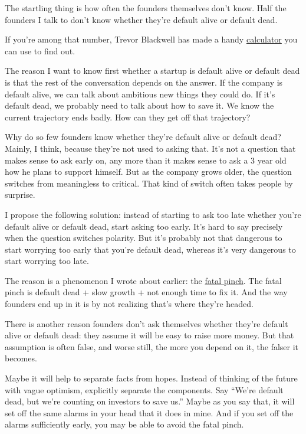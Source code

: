 \documentclass[12pt]{book}
\begin{document}
The startling thing is how often the founders themselves don't know.
Half the founders I talk to don't know whether they're default alive or
default dead.

If you're among that number, Trevor Blackwell has made a handy
\href{http://growth.tlb.org/\#}{calculator} you can use to find out.

The reason I want to know first whether a startup is default alive or
default dead is that the rest of the conversation depends on the answer.
If the company is default alive, we can talk about ambitious new things
they could do. If it's default dead, we probably need to talk about how
to save it. We know the current trajectory ends badly. How can they get
off that trajectory?

Why do so few founders know whether they're default alive or default
dead? Mainly, I think, because they're not used to asking that. It's not
a question that makes sense to ask early on, any more than it makes
sense to ask a 3 year old how he plans to support himself. But as the
company grows older, the question switches from meaningless to critical.
That kind of switch often takes people by surprise.

I propose the following solution: instead of starting to ask too late
whether you're default alive or default dead, start asking too early.
It's hard to say precisely when the question switches polarity. But it's
probably not that dangerous to start worrying too early that you're
default dead, whereas it's very dangerous to start worrying too late.

The reason is a phenomenon I wrote about earlier: the
\href{pinch.html}{fatal pinch}. The fatal pinch is default dead + slow
growth + not enough time to fix it. And the way founders end up in it is
by not realizing that's where they're headed.

There is another reason founders don't ask themselves whether they're
default alive or default dead: they assume it will be easy to raise more
money. But that assumption is often false, and worse still, the more you
depend on it, the falser it becomes.

Maybe it will help to separate facts from hopes. Instead of thinking of
the future with vague optimism, explicitly separate the components. Say
``We're default dead, but we're counting on investors to save us.''
Maybe as you say that, it will set off the same alarms in your head that
it does in mine. And if you set off the alarms sufficiently early, you
may be able to avoid the fatal pinch.
\end{document}
